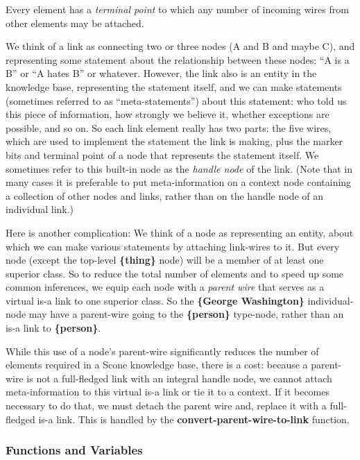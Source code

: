 \documentclass[titlepage,twoside,openright,11pt]{article}
\begin{document}
Every element has a \emph{terminal point} to which any number of
incoming wires from other elements may be attached.

We think of a link as connecting two or three nodes (A and B and maybe
C), and representing some statement about the relationship between these
nodes: ``A is a B'' or ``A hates B'' or whatever. However, the link also
is an entity in the knowledge base, representing the statement itself,
and we can make statements (sometimes referred to as
``meta-statements'') about this statement: who told us this piece of
information, how strongly we believe it, whether exceptions are
possible, and so on. So each link element really has two parts: the five
wires, which are used to implement the statement the link is making,
plus the marker bits and terminal point of a node that represents the
statement itself. We sometimes refer to this built-in node as the
\emph{handle node} of the link. (Note that in many cases it is
preferable to put meta-information on a context node containing a
collection of other nodes and links, rather than on the handle node of
an individual link.)

Here is another complication: We think of a node as representing an
entity, about which we can make various statements by attaching
link-wires to it. But every node (except the top-level
\textbf{\{thing\}} node) will be a member of at least one superior
class. So to reduce the total number of elements and to speed up some
common inferences, we equip each node with a \emph{parent wire} that
serves as a virtual is-a link to one superior class. So the
\textbf{\{George Washington\}} individual-node may have a parent-wire
going to the \textbf{\{person\}} type-node, rather than an is-a link to
\textbf{\{person\}}.

While this use of a node's parent-wire significantly reduces the number
of elements required in a Scone knowledge base, there is a cost: because
a parent-wire is not a full-fledged link with an integral handle node,
we cannot attach meta-information to this virtual is-a link or tie it to
a context. If it becomes necessary to do that, we must detach the parent
wire and, replace it with a full-fledged is-a link. This is handled by
the \textbf{convert-parent-wire-to-link} function.

\subsubsection{Functions and Variables}\label{functions-and-variables-1}
\end{document}
